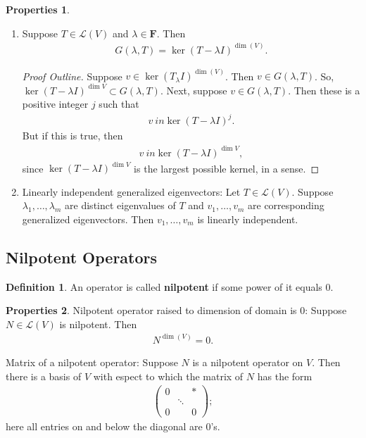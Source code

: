 \documentclass{article}
\theoremstyle{definition}
\newtheorem{defn}{Definition}[section]
\newtheorem{prop}{Properties}[section]
\newcommand{\lag}{\mathcal{L}}
\begin{document}
\begin{prop}
	\begin{enumerate}
		\item Suppose $T\in\lag(V)$ and $\lambda \in \mathbf{F}$. Then 
		\begin{align*}
		G(\lambda,T) = \ker(T-\lambda I)^{\dim(V)}.
		\end{align*}
		\begin{proof}[Proof Outline]
			Suppose $v\in \ker (T_\lambda I)^{\dim(V)}$. Then $v\in G(\lambda,T)$. So, $\ker(T-\lambda I)^{\dim V} \subset G(\lambda,T)$. Next, suppose $v\in G(\lambda,T)$. Then these is a positive integer $j$ such that
			\begin{align*}
			v\ in \ker (T-\lambda I)^j.
			\end{align*}
			But if this is true, then 
			\begin{align*}
			v\ in \ker (T-\lambda I)^{\dim V},
			\end{align*}
			since $\ker(T-\lambda I)^{\dim V}$ is the largest possible kernel, in a sense. 
		\end{proof}
		\item Linearly independent generalized eigenvectors: Let $T\in\lag(V)$. Suppose $\lambda_1,\dots,\lambda_m$ are distinct eigenvalues of $T$ and $v_1,\dots,v_m$ are corresponding generalized eigenvectors. Then $v_1,\dots,v_m$ is linearly independent.
	\end{enumerate}
\end{prop}

\subsection{Nilpotent Operators}
\begin{defn}
	An operator is called \textbf{nilpotent} if some power of it equals 0.
\end{defn}
\begin{prop}
	\item Nilpotent operator raised to dimension of domain is 0: Suppose $N\in \lag(V)$ is nilpotent. Then \begin{align*}
	N^{\dim(V)} = 0.
	\end{align*}
	\item Matrix of a nilpotent operator: Suppose $N$ is a nilpotent operator on $V$. Then there is a basis of $V$ with espect to which the matrix of $N$ has the form
	\begin{align*}
	\begin{pmatrix}
	0 & & *\\
	&\ddots&\\
	0&&0
	\end{pmatrix};
	\end{align*}
	here all entries on and below the diagonal are 0's. 
\end{prop}
\end{document}
